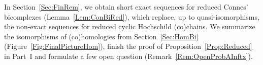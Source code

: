 \documentclass[\MainFolder/Text.tex]{subfiles}
\begin{document}
In Section~\ref{Sec:FinRem}, we obtain short exact sequences for reduced Connes' bicomplexes (Lemma~\ref{Lem:ConBiRed}), which replace, up to quasi-isomorphisms, the non-exact sequences for reduced cyclic Hochschild (co)chains. We summarize the isomorphisms of (co)homologies from Section~\ref{Sec:HomBi} (Figure~\ref{Fig:FinalPictureHom}), finish the proof of Proposition~\ref{Prop:Reduced} in Part~I and formulate a few open question (Remark~\ref{Rem:OpenProbAInftx}).
%
%
%
%
%
%
\end{document}
